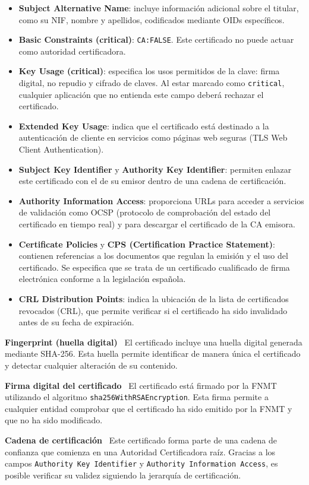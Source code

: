 \begin{itemize}

    \item \textbf{Subject Alternative Name}: incluye información adicional sobre el titular, como su NIF, nombre y apellidos, codificados mediante OIDs específicos.

    \item \textbf{Basic Constraints (critical)}: \texttt{CA:FALSE}. Este certificado no puede actuar como autoridad certificadora.

    \item \textbf{Key Usage (critical)}: especifica los usos permitidos de la clave: firma digital, no repudio y cifrado de claves. Al estar marcado como \texttt{critical}, cualquier aplicación que no entienda este campo deberá rechazar el certificado.

    \item \textbf{Extended Key Usage}: indica que el certificado está destinado a la autenticación de cliente en servicios como páginas web seguras (TLS Web Client Authentication).

    \item \textbf{Subject Key Identifier} y \textbf{Authority Key Identifier}: permiten enlazar este certificado con el de su emisor dentro de una cadena de certificación.

    \item \textbf{Authority Information Access}: proporciona URLs para acceder a servicios de validación como OCSP (protocolo de comprobación del estado del certificado en tiempo real) y para descargar el certificado de la CA emisora.

    \item \textbf{Certificate Policies} y \textbf{CPS (Certification Practice Statement)}: contienen referencias a los documentos que regulan la emisión y el uso del certificado. Se especifica que se trata de un certificado cualificado de firma electrónica conforme a la legislación española.

    \item \textbf{CRL Distribution Points}: indica la ubicación de la lista de certificados revocados (CRL), que permite verificar si el certificado ha sido invalidado antes de su fecha de expiración.

\end{itemize}

\textbf{Fingerprint (huella digital)} \ El certificado incluye una huella digital generada mediante SHA-256. Esta huella permite identificar de manera única el certificado y detectar cualquier alteración de su contenido.

\textbf{Firma digital del certificado} \ El certificado está firmado por la FNMT utilizando el algoritmo \texttt{sha256WithRSAEncryption}. Esta firma permite a cualquier entidad comprobar que el certificado ha sido emitido por la FNMT y que no ha sido modificado.

\textbf{Cadena de certificación} \ Este certificado forma parte de una cadena de confianza que comienza en una Autoridad Certificadora raíz. Gracias a los campos \texttt{Authority Key Identifier} y \texttt{Authority Information Access}, es posible verificar su validez siguiendo la jerarquía de certificación. 

